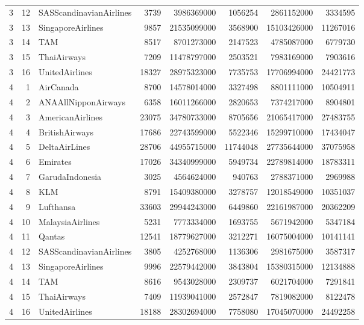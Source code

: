 \begin{tabular}{rrlrrrrr}
3 & 12 & SASScandinavianAirlines & 3739 & 3986369000 & 1056254 & 2861152000 & 3334595 \\
3 & 13 & SingaporeAirlines & 9857 & 21535099000 & 3568900 & 15103426000 & 11267016 \\
3 & 14 & TAM & 8517 & 8701273000 & 2147523 & 4785087000 & 6779730 \\
3 & 15 & ThaiAirways & 7209 & 11478797000 & 2503521 & 7983169000 & 7903616 \\
3 & 16 & UnitedAirlines & 18327 & 28975323000 & 7735753 & 17706994000 & 24421773 \\
4 & 1 & AirCanada & 8700 & 14578014000 & 3327498 & 8801111000 & 10504911 \\
4 & 2 & ANAAllNipponAirways & 6358 & 16011266000 & 2820653 & 7374217000 & 8904801 \\
4 & 3 & AmericanAirlines & 23075 & 34780733000 & 8705656 & 21065417000 & 27483755 \\
4 & 4 & BritishAirways & 17686 & 22743599000 & 5522346 & 15299710000 & 17434047 \\
4 & 5 & DeltaAirLines & 28706 & 44955715000 & 11744048 & 27735644000 & 37075958 \\
4 & 6 & Emirates & 17026 & 34340999000 & 5949734 & 22789814000 & 18783311 \\
4 & 7 & GarudaIndonesia & 3025 & 4564624000 & 940763 & 2788371000 & 2969988 \\
4 & 8 & KLM & 8791 & 15409380000 & 3278757 & 12018549000 & 10351037 \\
4 & 9 & Lufthansa & 33603 & 29944243000 & 6449860 & 22161987000 & 20362209 \\
4 & 10 & MalaysiaAirlines & 5231 & 7773334000 & 1693755 & 5671942000 & 5347184 \\
4 & 11 & Qantas & 12541 & 18779627000 & 3212271 & 16075004000 & 10141141 \\
4 & 12 & SASScandinavianAirlines & 3805 & 4252768000 & 1136306 & 2981675000 & 3587317 \\
4 & 13 & SingaporeAirlines & 9996 & 22579442000 & 3843804 & 15380315000 & 12134888 \\
4 & 14 & TAM & 8616 & 9543028000 & 2309737 & 6021704000 & 7291841 \\
4 & 15 & ThaiAirways & 7409 & 11939041000 & 2572847 & 7819082000 & 8122478 \\
4 & 16 & UnitedAirlines & 18188 & 28302694000 & 7758080 & 17045070000 & 24492258 \\
\bottomrule
\end{tabular}
